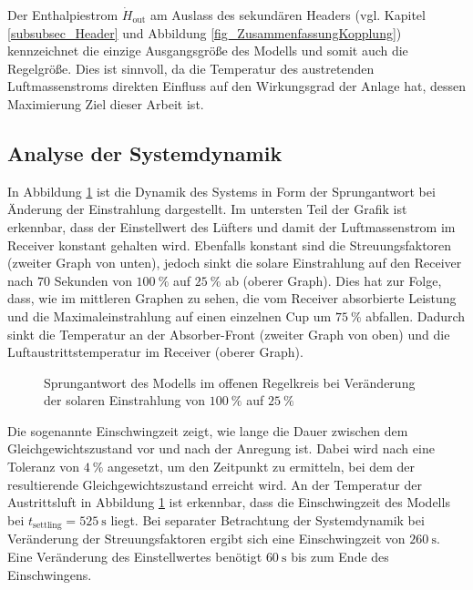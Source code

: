 Der Enthalpiestrom $\dot{H}_{\mathrm{out}}$ am Auslass des sekundären Headers (vgl. Kapitel \ref{subsubsec_Header} und Abbildung \ref{fig_ZusammenfassungKopplung}) kennzeichnet die einzige Ausgangsgröße des Modells und somit auch die Regelgröße.
Dies ist sinnvoll, da die Temperatur des austretenden Luftmassenstroms direkten Einfluss auf den Wirkungsgrad der Anlage hat, dessen Maximierung Ziel dieser Arbeit ist.

\subsection{Analyse der Systemdynamik} \label{subsec_Systemdynamik}
In Abbildung \ref{fig_Sprungantwort} ist die Dynamik des Systems in Form der Sprungantwort bei Änderung der Einstrahlung dargestellt.
Im untersten Teil der Grafik ist erkennbar, dass der Einstellwert des Lüfters und damit der Luftmassenstrom im Receiver konstant gehalten wird.
Ebenfalls konstant sind die Streuungsfaktoren (zweiter Graph von unten), jedoch sinkt die solare Einstrahlung auf den Receiver nach $70$ Sekunden von $\SI{100}{\percent}$ auf $\SI{25}{\percent}$ ab (oberer Graph).
Dies hat zur Folge, dass, wie im mittleren Graphen zu sehen, die vom Receiver absorbierte Leistung und die Maximaleinstrahlung auf einen einzelnen Cup um $\SI{75}{\percent}$ abfallen.
Dadurch sinkt die Temperatur an der Absorber-Front (zweiter Graph von oben) und die Luftaustrittstemperatur im Receiver (oberer Graph).

\begin{figure}[h!]
    \centering
    \setlength{\fboxsep}{1pt}
    \setlength{\fboxrule}{1pt}
    \caption[Sprungantwort des Modells im offenen Regelkreis bei Veränderung der solaren Einstrahlung von $\SI{100}{\percent}$ auf $\SI{25}{\percent}$]{Sprungantwort des Modells im offenen Regelkreis bei Veränderung der solaren Einstrahlung von $\SI{100}{\percent}$ auf $\SI{25}{\percent}$}
    \label{fig_Sprungantwort}
\end{figure}

Die sogenannte Einschwingzeit zeigt, wie lange die Dauer zwischen dem Gleichgewichtszustand vor und nach der Anregung ist.
Dabei wird nach \cite[S.223]{Zacher} eine Toleranz von $\SI{4}{\percent}$ angesetzt, um den Zeitpunkt zu ermitteln, bei dem der resultierende Gleichgewichtszustand erreicht wird.
An der Temperatur der Austrittsluft in Abbildung \ref{fig_Sprungantwort} ist erkennbar, dass die Einschwingzeit des Modells bei $t_{\mathrm{settling}} = \SI{525}{\second}$ liegt.
Bei separater Betrachtung der Systemdynamik bei Veränderung der Streuungsfaktoren ergibt sich eine Einschwingzeit von $\SI{260}{\second}$.
Eine Veränderung des Einstellwertes benötigt $\SI{60}{\second}$ bis zum Ende des Einschwingens.


